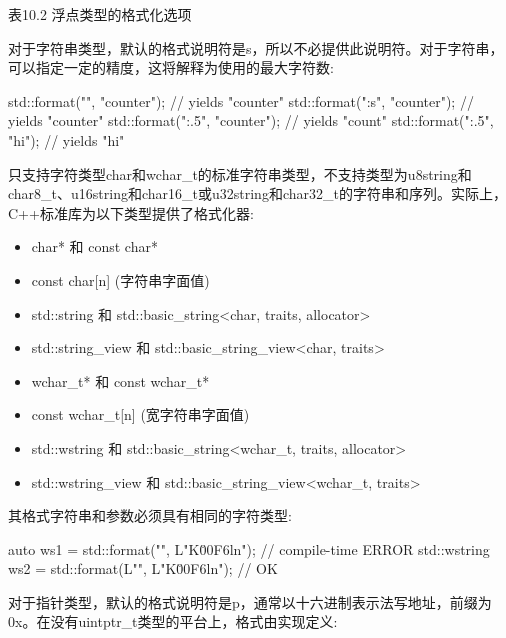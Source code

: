 \begin{center}
表10.2 浮点类型的格式化选项
\end{center}


对于字符串类型，默认的格式说明符是s，所以不必提供此说明符。对于字符串，可以指定一定的精度，这将解释为使用的最大字符数:

\begin{cpp}
std::format("{}", "counter"); // yields "counter"
std::format("{:s}", "counter"); // yields "counter"
std::format("{:.5}", "counter"); // yields "count"
std::format("{:.5}", "hi"); // yields "hi"
\end{cpp}

只支持字符类型char和wchar\_t的标准字符串类型，不支持类型为u8string和char8\_t、u16string和char16\_t或u32string和char32\_t的字符串和序列。实际上，C++标准库为以下类型提供了格式化器:

\begin{itemize}
\item
char* 和 const char*

\item
const char[n] (字符串字面值)

\item
std::string 和 std::basic\_string<char, traits, allocator>

\item
std::string\_view 和 std::basic\_string\_view<char, traits>

\item
wchar\_t* 和 const wchar\_t*

\item
const wchar\_t[n] (宽字符串字面值)

\item
std::wstring 和 std::basic\_string<wchar\_t, traits, allocator>

\item
std::wstring\_view 和 std::basic\_string\_view<wchar\_t, traits>
\end{itemize}

其格式字符串和参数必须具有相同的字符类型:

\begin{cpp}
auto ws1 = std::format("{}", L"K\u00F6ln"); // compile-time ERROR
std::wstring ws2 = std::format(L"{}", L"K\u00F6ln"); // OK
\end{cpp}


对于指针类型，默认的格式说明符是p，通常以十六进制表示法写地址，前缀为0x。在没有uintptr\_t类型的平台上，格式由实现定义:

